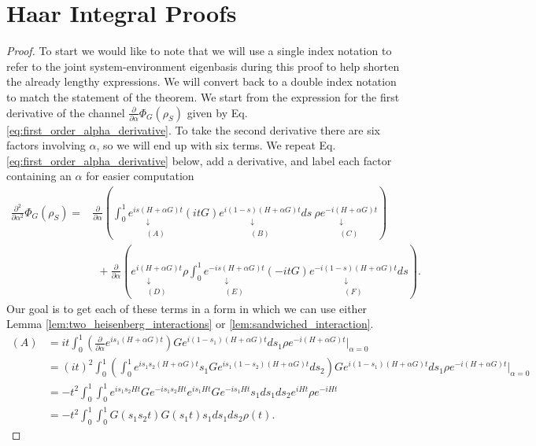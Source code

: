 \documentclass{article}
\newcommand{\parens}[1]{\left( #1 \right)}
\begin{document}
\section{Haar Integral Proofs} \label{sec:haar_integral_appendix}
\secondOrderChannelHaar*
\begin{proof}
To start we would like to note that we will use a single index notation to refer to the joint system-environment eigenbasis during this proof to help shorten the already lengthy expressions. We will convert back to a double index notation to match the statement of the theorem. We start from the expression for the first derivative of the channel $\frac{\partial}{\partial \alpha} \Phi_G(\rho_S)$ given by Eq. \eqref{eq:first_order_alpha_derivative}. To take the second derivative there are six factors involving $\alpha$, so we will end up with six terms. We repeat Eq. \eqref{eq:first_order_alpha_derivative} below, add a derivative, and label each factor containing an $\alpha$ for easier computation
\begin{align}
    \frac{\partial^2}{\partial \alpha^2} \Phi_G(\rho_S) =& \frac{\partial}{\partial \alpha} \parens{\int_{0}^{1} \underset{\substack{\downarrow \\ (A)}}{e^{i s (H+\alpha G)t}} (i t G) \underset{\substack{\downarrow \\ (B)}}{e^{i (1-s) (H+\alpha G)t}} ds ~ \rho \underset{\substack{\downarrow \\ (C)}}{e^{-i(H+\alpha G)t}} } \nonumber \\
    &~ ~+\frac{\partial}{\partial \alpha} \parens{ \underset{\substack{\downarrow \\ (D)} }{e^{i(H+\alpha G)t}} \rho \int_{0}^1 \underset{\substack{\downarrow \\ (E)} }{e^{-i s (H+\alpha G) t} } (- i t G) \underset{\substack{\downarrow \\ (F)}}{e^{-i (1-s) (H+\alpha G)t}} ds }.
\end{align}
Our goal is to get each of these terms in a form in which we can use either Lemma \ref{lem:two_heisenberg_interactions} or \ref{lem:sandwiched_interaction}. 
\begin{align}
    (A) &=i t\int_0^1 \parens{\frac{\partial}{\partial \alpha} e^{i s_1 (H+ \alpha G)t}} G e^{i(1-s_1)(H+\alpha G)t} ds_1 \rho e^{-i (H+\alpha G)t} \bigg|_{\alpha=0} \\
    &= (it)^2 \int_0^1 \parens{\int_0^1 e^{i s_1 s_2 (H+\alpha G)t} s_1 G e^{i s_1 (1-s_2) (H+\alpha G)t} ds_2} G e^{i(1-s_1) (H+\alpha G)t} ds_1 \rho e^{-i(H+\alpha G) t} \bigg|_{\alpha=0} \label{eq:second_order_deriv_intermediate_a}\\
    &= -t^2 \int_0^1 \int_0^1 e^{i s_1 s_2 H t} G e^{-i s_1 s_2 H t} e^{i s_1 H t} G e^{-i s_1 H t} s_1 ds_1 ds_2 e^{i H t} \rho e^{-i H t} \\
    &= -t^2 \int_0^1 \int_0^1 G(s_1 s_2 t) G(s_1 t) s_1 ds_1 ds_2 \rho(t). \label{eq:second_deriv_alpha_first_term}
\end{align}


\end{proof}
\end{document}
